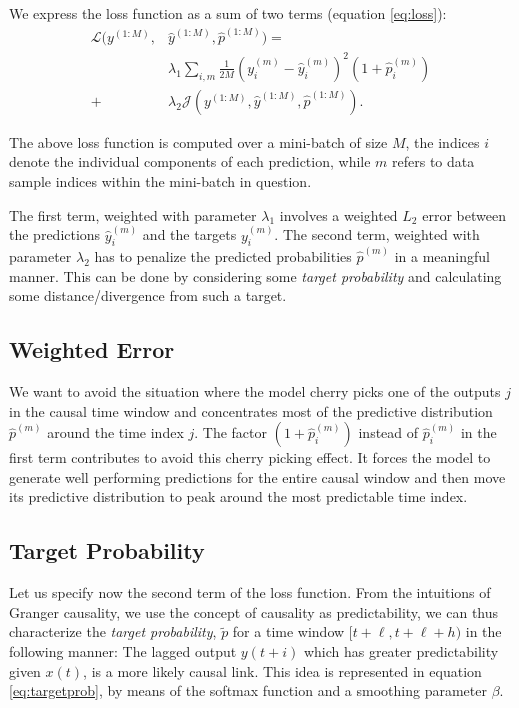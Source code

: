 \documentclass[twoside]{article}
\begin{document}
We express the loss function as a sum of two terms (equation \ref{eq:loss}):
\begin{equation}\label{eq:loss}
\begin{aligned}
\mathcal{L}(y^{(1:M)}, &\hat{y}^{(1:M)}, \hat{p}^{(1:M)}) =\\ 
&\lambda_1 \sum_{i,m}{\frac{1}{2M} (y^{(m)}_{i} - \hat{y}^{(m)}_{i})^2 (1 + \hat{p}^{(m)}_i)} \\ 
+ &\lambda_2 \mathcal{J}(y^{(1:M)}, \hat{y}^{(1:M)}, \hat{p}^{(1:M)}).
\end{aligned}
\end{equation}

The above loss function is computed over a mini-batch of size $M$, the indices $i$ denote the
individual components of each prediction, while $m$ refers to data sample indices within the
mini-batch in question.

The first term, weighted with parameter $\lambda_1$ involves a weighted $L_2$ 
error between the predictions $\hat{y}^{(m)}_{i}$ and the targets $y^{(m)}_{i}$. The second term, weighted with parameter $\lambda_2$ has to penalize the predicted probabilities $\hat{p}^{(m)}$ in a meaningful manner. This can be done by considering some \emph{target probability} and calculating some distance/divergence from such a target.

\subsection{Weighted Error}

We want to avoid the situation where the model cherry picks one of the outputs $j$ in the causal time window and concentrates most of the predictive distribution $\hat p^{(m)}$ around the time index $j$. 
The factor $(1+\hat p_i^{(m)})$ instead of $\hat p_i^{(m)}$ in the first term contributes 
to avoid this cherry picking effect. It forces the model to generate well performing
predictions for the entire causal window and then move its predictive distribution
to peak around the most predictable time index.

\subsection{Target Probability}

Let us specify now the second term of the loss function.
From the intuitions of Granger causality, we use the concept of causality as predictability, we can thus characterize the \emph{target probability}, $\widetilde{p}$ for a time window $[t+\ell, t+\ell+h)$ in the following manner: The lagged output $y(t+i)$ which has greater predictability given $x(t)$, is a more likely causal link. This idea is represented in equation \ref{eq:targetprob}, by means of the softmax function and a smoothing parameter $\beta$.
\end{document}
